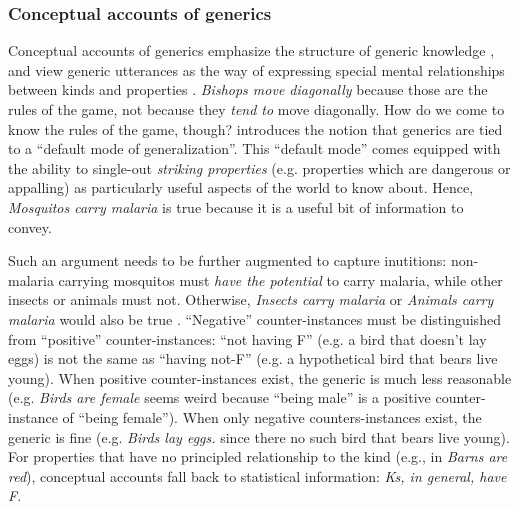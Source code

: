 \documentclass[12pt,letterpaper]{article}
\begin{document}
\subsubsection*{Conceptual accounts of generics}

Conceptual accounts of generics emphasize the structure of generic knowledge \cite{Prasada2000}, and view generic utterances as the way of expressing special mental relationships between kinds and properties \cite{Leslie2008, Prasada2012}.
\emph{Bishops move diagonally} because those are the rules of the game, not because they \emph{tend to} move diagonally.
How do we come to know the rules of the game, though?
 introduces the notion that generics are tied to a ``default mode of generalization''. 
This ``default mode'' comes equipped with the ability to single-out \emph{striking properties} (e.g. properties which are dangerous or appalling) as particularly useful aspects of the world to know about. 
Hence, \emph{Mosquitos carry malaria} is true because it is a useful bit of information to convey.

Such an argument needs to be further augmented to capture inutitions: non-malaria carrying mosquitos must \emph{have the potential} to carry malaria, while other insects or animals must not. Otherwise, \emph{Insects carry malaria} or \emph{Animals carry malaria} would also be true \cite{Leslie2007}.
``Negative'' counter-instances must be distinguished from ``positive'' counter-instances: ``not having F'' (e.g. a bird that doesn't lay eggs) is not the same as ``having not-F'' (e.g. a hypothetical bird that bears live young).
When positive counter-instances exist, the generic is much less reasonable (e.g. \emph{Birds are female} seems weird because ``being male'' is a positive counter-instance of ``being female''). 
When only negative counters-instances exist, the generic is fine (e.g. \emph{Birds lay eggs.} since there no such bird that bears live young).
For properties that have no principled relationship to the kind (e.g., in \emph{Barns are red}), conceptual accounts fall back to statistical information: \emph{Ks, in general, have F}.
\end{document}
